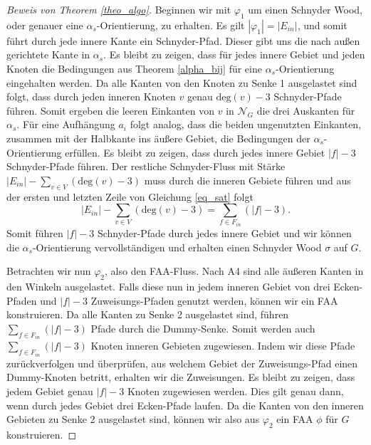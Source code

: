 \begin{proof}[Beweis von Theorem \ref{theo_algo}]
Beginnen wir mit $\varphi_1$ um einen Schnyder Wood, oder genauer eine $\alpha_s$-Orientierung, zu erhalten. Es gilt $|\varphi_1| = |E_{in}|$, und somit führt durch jede innere Kante ein Schnyder-Pfad. Dieser gibt uns die nach außen gerichtete Kante in $\alpha_s$. Es bleibt zu zeigen, dass für jedes innere Gebiet und jeden Knoten die Bedingungen aus Theorem \ref{alpha_bij} für eine $\alpha_s$-Orientierung eingehalten werden. Da alle Kanten von den Knoten zu Senke 1 ausgelastet sind folgt, dass durch jeden inneren Knoten $v$ genau $\text{deg}(v)-3$ Schnyder-Pfade führen. Somit ergeben die leeren Einkanten von $v$ in $\mathcal{N}_G$ die drei Auskanten für $\alpha_s$. Für eine Aufhängung $a_i$ folgt analog, dass die beiden ungenutzten Einkanten, zusammen mit der Halbkante ins äußere Gebiet, die Bedingungen der $\alpha_s$-Orientierung erfüllen. Es bleibt zu zeigen, dass durch jedes innere Gebiet $|f|-3$ Schnyder-Pfade führen. Der restliche Schnyder-Fluss mit Stärke $|E_{in}| - \sum_{v \in V} (\text{deg}(v)-3)$ muss durch die inneren Gebiete führen und aus der ersten und letzten Zeile von Gleichung \ref{eq_sat} folgt $$|E_{in}| - \sum_{v \in V} (\text{deg}(v)-3) = \sum_{f \in F_{in}} (|f|-3).$$
Somit führen $|f|-3$ Schnyder-Pfade durch jedes innere Gebiet und wir können die $\alpha_s$-Orientierung vervollständigen und erhalten einen Schnyder Wood $\sigma$ auf $G$.

Betrachten wir nun $\varphi_2$, also den FAA-Fluss. Nach A4 sind alle äußeren Kanten in den Winkeln ausgelastet. Falls diese nun in jedem inneren Gebiet von drei Ecken-Pfaden und $|f|-3$ Zuweisungs-Pfaden genutzt werden, können wir ein FAA konstruieren. Da alle Kanten zu Senke 2 ausgelastet sind, führen $\sum_{f \in F_{in}} (|f|-3)$ Pfade durch die Dummy-Senke. Somit werden auch $\sum_{f \in F_{in}} (|f|-3)$ Knoten inneren Gebieten zugewiesen. Indem wir diese Pfade zurückverfolgen und überprüfen, aus welchem Gebiet der Zuweisungs-Pfad einen Dummy-Knoten betritt, erhalten wir die Zuweisungen. Es bleibt zu zeigen, dass jedem Gebiet genau $|f|-3$ Knoten zugewiesen werden. Dies gilt genau dann, wenn durch jedes Gebiet drei Ecken-Pfade laufen. Da die Kanten von den inneren Gebieten zu Senke 2 ausgelastet sind, können wir also aus $\varphi_2$ ein FAA $\phi$ für $G$ konstruieren.


\end{proof}
